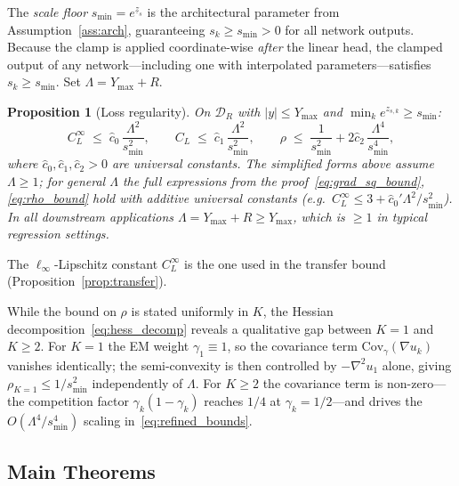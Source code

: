 \documentclass[11pt]{article}
\newtheorem{proposition}[theorem]{Proposition}
\newcommand{\cB}{\mathcal{B}}
\newcommand{\cD}{\mathcal{D}}  %
\begin{document}
The \emph{scale floor} $s_{\min} = e^{\underline{z}_s}$ is the
architectural parameter from Assumption~\ref{ass:arch}, guaranteeing
$s_k \ge s_{\min} > 0$ for all network outputs.
Because the clamp is applied coordinate-wise \emph{after} the linear
head, the clamped output of any network---including one with
interpolated parameters---satisfies $s_k \ge s_{\min}$.
Set $\Lambda = Y_{\max} + R$.

\begin{proposition}[Loss regularity]\label{prop:loss_regularity}
On $\cD_R$ with $|y| \le Y_{\max}$ and $\min_k e^{z_{s,k}} \ge s_{\min}$:
\begin{equation}\label{eq:refined_bounds}
  C_L^\infty \;\le\; \hat c_0\,\frac{\Lambda^2}{s_{\min}^2},
  \qquad
  C_L \;\le\; \hat c_1\,\frac{\Lambda^2}{s_{\min}^2},
  \qquad
  \rho \;\le\; \frac{1}{s_{\min}^2}
  + 2\hat c_2\,\frac{\Lambda^4}{s_{\min}^4},
\end{equation}
where $\hat c_0, \hat c_1, \hat c_2 > 0$ are universal constants.
The simplified forms above assume $\Lambda \ge 1$;
for general $\Lambda$ the full expressions
from the proof~\eqref{eq:grad_sq_bound}, \eqref{eq:rho_bound} hold
with additive universal constants
(e.g.\ $C_L^\infty \le 3 + \hat c_0' \Lambda^2/s_{\min}^2$).
In all downstream applications $\Lambda = Y_{\max} + R \ge Y_{\max}$,
which is $\ge 1$ in typical regression settings.
\end{proposition}

The $\ell_\infty$-Lipschitz constant $C_L^\infty$ is the one used in
the transfer bound (Proposition~\ref{prop:transfer}).

While the bound on $\rho$ is stated uniformly in $K$,
the Hessian decomposition~\eqref{eq:hess_decomp} reveals a
qualitative gap between $K=1$ and $K \ge 2$.
For $K=1$ the EM weight $\gamma_1 \equiv 1$, so the
covariance term $\mathrm{Cov}_\gamma(\nabla u_k)$ vanishes
identically; the semi-convexity is then controlled by
$-\nabla^2 u_1$ alone, giving $\rho_{K=1} \le 1/s_{\min}^2$
independently of $\Lambda$.
For $K \ge 2$ the covariance term is non-zero---the competition
factor $\gamma_k(1-\gamma_k)$ reaches $1/4$ at
$\gamma_k = 1/2$---and drives the $O(\Lambda^4/s_{\min}^4)$
scaling in~\eqref{eq:refined_bounds}.

\subsection{Main Theorems}\label{sec:main_theorem}
\end{document}
